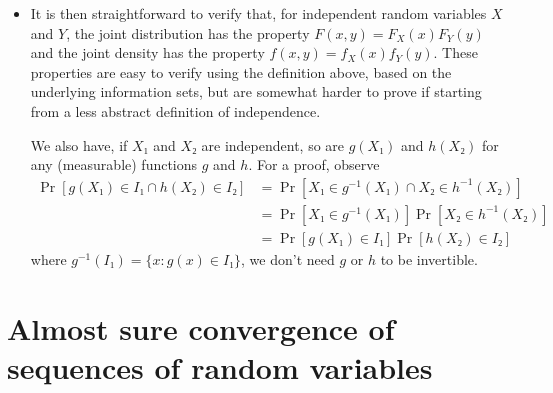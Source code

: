 \begin{itemize}
\item It is then straightforward to verify that, for independent
  random variables $X$ and $Y$, the joint distribution has the
  property $F(x, y) = F_X(x) F_Y(y)$ and the joint density has the
  property $f(x,y) = f_X(x) f_Y(y)$.  These properties are easy to
  verify using the definition above, based on the underlying
  information sets, but are somewhat harder to prove if starting from
  a less abstract definition of independence.

  We also have, if $X₁$ and $X₂$ are independent, so are $g(X₁)$ and
  $h(X₂)$ for any (measurable) functions $g$ and $h$.  For a proof,
  observe
  \begin{align*}
    \Pr[g(X₁) ∈ I₁ ∩ h(X₂) ∈ I₂]
    &= \Pr[X₁ ∈ g^{-1}(X₁) ∩ X₂ ∈ h^{-1}(X₂)] \\
    &= \Pr[X₁ ∈ g^{-1}(X₁)] \Pr[X₂ ∈ h^{-1}(X₂)] \\
    &= \Pr[g(X₁) ∈ I₁] \Pr[h(X₂) ∈ I₂]
  \end{align*}
  where $g^{-1}(I₁) = \{x : g(x) ∈ I₁\}$, we don't need $g$ or $h$ to
  be invertible.

\end{itemize}

\section{Almost sure convergence of sequences of random variables}

